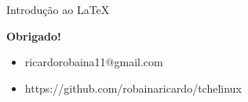 \documentclass{beamer}
\begin{document}
\begin{frame}{Introdução ao \LaTeX}
	
		\newline
		\begin{center}
			{\Huge  \textbf{Obrigado!} \\}
		\end{center}
		
		{\normalsize 
			\begin{itemize}
				\item ricardorobaina11@gmail.com 
				\item https://github.com/robainaricardo/tchelinux \\ \newline   
			\end{itemize}	
		}
		\maketitle
	
\end{frame}
\end{document}
